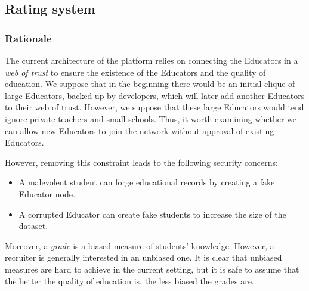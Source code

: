 \subsection{Rating system}
\label{apx:ratings}

\subsubsection*{Rationale}
The current architecture of the platform relies on connecting the Educators in a
\textit{web of trust} to ensure the existence of the Educators and the quality
of education. We suppose that in the beginning there would be an initial clique
of large Educators, backed up by developers, which will later add another
Educators to their web of trust. However, we suppose that these large Educators would
tend ignore private teachers and small schools. Thus, it worth examining whether
we can allow new Educators to join the network without approval of existing Educators.

However, removing this constraint leads to the following security concerns:
\begin{itemize}
\item A malevolent student can forge educational records by creating a fake Educator node.
\item A corrupted Educator can create fake students to increase the size of the dataset.
\end{itemize}

Moreover, a \textit{grade} is a biased measure of students' knowledge. However,
a recruiter is generally interested in an unbiased one. It is clear that
unbiased measures are hard to achieve in the current setting, but it is safe to
assume that the better the quality of education is, the less biased the grades
are.

